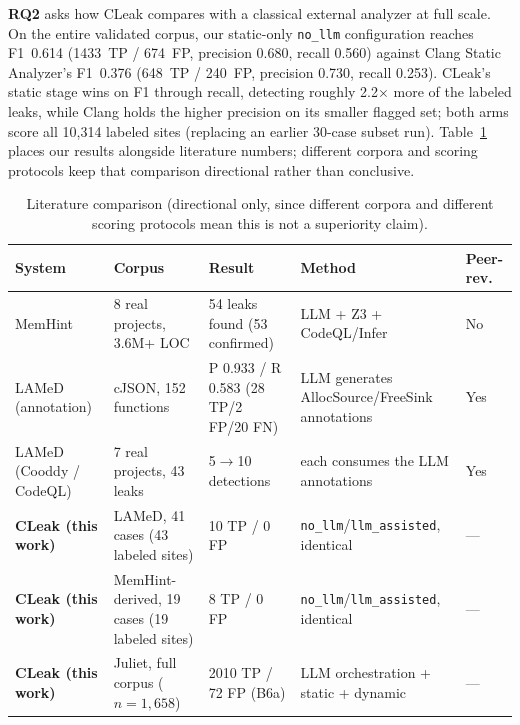 \documentclass[a4paper]{llncs}
\begin{document}
\textbf{RQ2} asks how CLeak compares with a classical external analyzer
at full scale. On the entire validated corpus, our static-only
\texttt{no\_llm} configuration reaches F1~0.614 (1433~TP / 674~FP,
precision 0.680, recall 0.560) against Clang Static Analyzer's F1~0.376
(648~TP / 240~FP, precision 0.730, recall 0.253). CLeak's static stage
wins on F1 through recall, detecting roughly 2.2$\times$ more of the
labeled leaks, while Clang holds the higher precision on its smaller
flagged set; both arms score all 10{,}314 labeled sites (replacing an
earlier 30-case subset run). Table~\ref{tab:literature} places our
results alongside
literature numbers; different corpora and scoring protocols keep that
comparison directional rather than conclusive.

\begin{table}[htbp]
\centering
\caption{Literature comparison (directional only, since different corpora and
different scoring protocols mean this is not a superiority claim).}
\label{tab:literature}
\footnotesize
\begin{tabular}{@{}p{2.1cm}p{3.6cm}p{3.7cm}p{2.4cm}p{1.3cm}@{}}
\toprule
\textbf{System} & \textbf{Corpus} & \textbf{Result} & \textbf{Method} & \textbf{Peer-rev.} \\
\midrule
MemHint~\cite{memhint} & 8 real projects, 3.6M+ LOC & 54 leaks found (53 confirmed) & LLM + Z3 + CodeQL/Infer & No \\
LAMeD~\cite{lamed} (annotation) & cJSON, 152 functions & P 0.933 / R 0.583 (28 TP/2 FP/20 FN) & LLM generates AllocSource/FreeSink annotations & Yes \\
LAMeD~\cite{lamed} (Cooddy / CodeQL) & 7 real projects, 43 leaks & 5$\to$10 detections & each consumes the LLM annotations & Yes \\
\textbf{CLeak (this work)} & LAMeD, 41 cases (43 labeled sites) & 10 TP / 0 FP & \texttt{no\_llm}/\texttt{llm\_assisted}, identical & --- \\
\textbf{CLeak (this work)} & MemHint-derived, 19 cases (19 labeled sites) & 8 TP / 0 FP & \texttt{no\_llm}/\texttt{llm\_assisted}, identical & --- \\
\textbf{CLeak (this work)} & Juliet, full corpus ($n{=}1{,}658$) & 2010 TP / 72 FP (B6a) & LLM orchestration + static + dynamic & --- \\
\bottomrule
\end{tabular}
\end{table}
\end{document}

